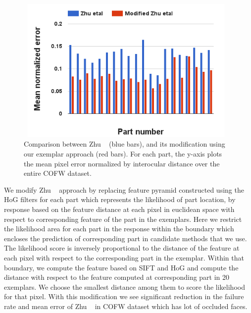

%
%
%
%


\begin{figure}
  \centering
  \includegraphics[width=4.3in,height=2.8in]{fid/figures/deva_modification_parts_mean_error2.png}
  \caption{Comparison between Zhu \etal~\cite{xhuCVPR12_wild} (blue bars), and its modification
  using our exemplar approach (red bars). For each part, the y-axis plots the mean pixel error
  normalized by interocular distance over the entire COFW dataset.}
\end{figure}

\label{sec:modification_xhu}
We modify Zhu \etal~\cite{xhuCVPR12_wild} approach by replacing feature pyramid constructed using the HoG filters for each part which represents the likelihood of part location, 
by response based on the feature distance at each pixel in euclidean space with respect to corresponding feature of the part in the exemplars. 
Here we restrict the likelihood area for each part in the response within the boundary which
encloses the prediction of corresponding part in candidate
methods that we use. The likelihood score is inversely proportional to the distance of the feature at each pixel with respect to the corresponding part 
in the exemplar. Within that boundary, we compute the feature based on SIFT and HoG and compute the distance with respect to the feature computed 
at corresponding part in 20 exemplars. We choose the smallest distance among them to score the likelihood for that pixel. 
With this modification we see significant reduction in the failure rate and mean error of Zhu
\etal~\cite{xhuCVPR12_wild} in COFW dataset which has lot of occluded faces.
